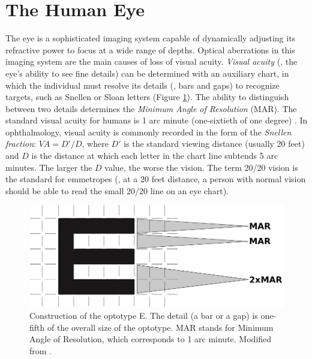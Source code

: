 
\section{The Human Eye}
\label{sec:TheHumanEye}

The eye is a sophisticated imaging system capable of dynamically adjusting its refractive power to focus at a wide range of depths. Optical aberrations in this imaging system are the main causes of loss of visual acuity. {\it Visual acuity} (\ie, the eye's ability to see fine details) can be determined with an auxiliary chart, in which the individual must resolve its details (\eg, bars and gaps) to recognize targets, such as Snellen or Sloan letters (Figure \ref{fig:visual_acuity}). The ability to distinguish between two details determines the {\it Minimum Angle of Resolution} (MAR). The standard visual acuity for humans is 1 arc minute (one-sixtieth of one degree) \cite{Schwartz2010}. In ophthalmology, visual acuity is commonly recorded in the form of the {\it Snellen fraction}: $VA = D'/D$, where $D'$ is the standard viewing distance (usually 20 feet) and $D$ is the distance at which each letter in the chart line subtends 5 arc minutes. The larger the $D$ value, the worse the vision. The term 20/20 vision is the standard for emmetropes (\ie, at a 20 feet distance, a person with normal vision should be able to read the small 20/20 line on an eye chart).

\begin{figure}[h]

	\centering
	\includegraphics[width=1.0\linewidth]{__Images/02/e_optotype.png}
	\caption[Construction of the optotype E]{Construction of the optotype E. The detail (a bar or a gap) is one-fifth of the overall size of the optotype. MAR stands for Minimum Angle of Resolution, which corresponds to 1 arc minute. Modified from \citet{Schwartz2010}.}
	\label{fig:visual_acuity}
\end{figure}